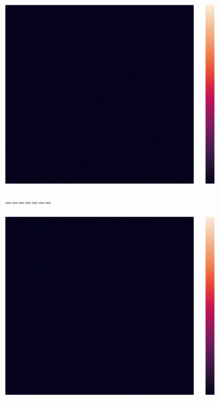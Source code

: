 \documentclass[12pt,%
               a4paper,%
               oneside,openany,%
               titlepage,%
               headinclude,footinclude,%
               BCOR5mm,%
               cleardoublepage=empty,%
               tablecaptionabove,%
               floatperchapter,
               ]{scrreprt}                 %
\begin{document}
\begin{figure}[ht]
\begin{minipage}[b]{0.5\linewidth}
\begin{figure}[ht]
\begin{minipage}[b]{0.5\linewidth}
    \includegraphics[width=.9\linewidth]{Figures/Matrix_pfizer.jpg}
    \vspace{4ex}
  \end{minipage}
\begin{minipage}[b]{0.5\linewidth}
=======
    \begin{minipage}[b]{0.5\linewidth}
  \centering
  \includegraphics[width=.9\linewidth]{Figures/Matrix_pfizer.jpg}
  \vspace{4ex}
\end{minipage}
  \end{minipage}
    \begin{minipage}[b]{0.5\linewidth}

\end{minipage}
\end{figure}
\end{minipage}
\end{figure}
\end{document}

